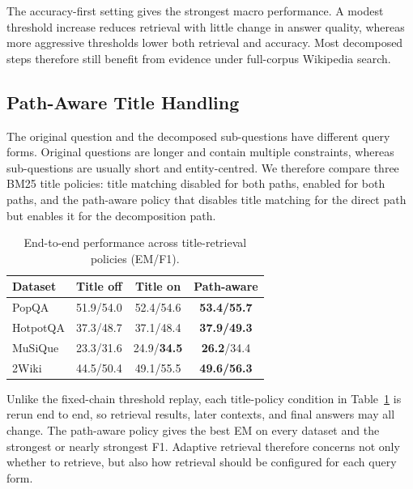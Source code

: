 The accuracy-first setting gives the strongest macro performance. A modest threshold increase reduces retrieval with little change in answer quality, whereas more aggressive thresholds lower both retrieval and accuracy. Most decomposed steps therefore still benefit from evidence under full-corpus Wikipedia search.

\subsection{Path-Aware Title Handling}
\label{sec:title-policy}

The original question and the decomposed sub-questions have different query forms. Original questions are longer and contain multiple constraints, whereas sub-questions are usually short and entity-centred. We therefore compare three BM25 title policies: title matching disabled for both paths, enabled for both paths, and the path-aware policy that disables title matching for the direct path but enables it for the decomposition path.

\begin{table}[h]
    \centering
    \caption[Path-Aware Title Retrieval]{End-to-end performance across title-retrieval policies (EM/F1).}
    \label{tab:title-policy}
    \setlength{\tabcolsep}{7pt}
    \small
    \begin{tabular}{ l c c c }
        \toprule
        Dataset & Title off & Title on & Path-aware \\
        \midrule
        PopQA & 51.9/54.0 & 52.4/54.6 & \textbf{53.4/55.7} \\
        HotpotQA & 37.3/48.7 & 37.1/48.4 & \textbf{37.9/49.3} \\
        MuSiQue & 23.3/31.6 & 24.9/\textbf{34.5} & \textbf{26.2}/34.4 \\
        2Wiki & 44.5/50.4 & 49.1/55.5 & \textbf{49.6/56.3} \\
        \bottomrule
    \end{tabular}
\end{table}

Unlike the fixed-chain threshold replay, each title-policy condition in Table~\ref{tab:title-policy} is rerun end to end, so retrieval results, later contexts, and final answers may all change. The path-aware policy gives the best EM on every dataset and the strongest or nearly strongest F1. Adaptive retrieval therefore concerns not only whether to retrieve, but also how retrieval should be configured for each query form.

